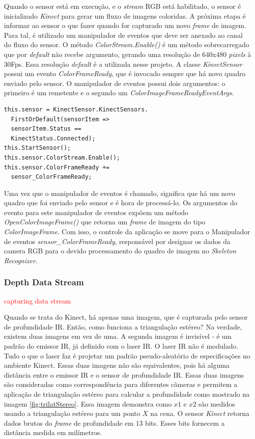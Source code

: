 Quando o sensor está em execução, e o \textit{stream} RGB está habilitado, o sensor é inicializado  \textit{Kinect} para gerar um fluxo de imagens coloridas. A próxima etapa é informar ao sensor o que fazer quando for capturado um novo \textit{frame} de imagem. Para tal, é utilizado um manipulador de eventos que deve ser anexado ao canal do fluxo do sensor. O método \textit{ColorStream.Enable()} é um método sobrecarregado que por \textit{default} não recebe argumento, gerando uma resolução de  640x480 \textit{pixels} à 30Fps. Essa resolução \textit{default} é a utilizada nesse projeto. A classe \textit{KinectSensor} possui um evento \textit{ColorFrameReady}, que é invocado sempre que há novo quadro enviado pelo sensor. O manipulador de eventos possui dois argumentos: o primeiro é um remetente e o segundo um \textit{ColorImageFrameReadyEventArgs}.

\begin{verbatim}
this.sensor = KinectSensor.KinectSensors.
  FirstOrDefault(sensorItem => 
  sensorItem.Status == 
  KinectStatus.Connected);
this.StartSensor();
this.sensor.ColorStream.Enable();
this.sensor.ColorFrameReady += 
  sensor_ColorFrameReady;
\end{verbatim}


Uma vez que o manipulador de eventos é chamado, significa que há um novo quadro que foi enviado pelo sensor e é hora de processá-lo. Os argumentos do evento para este manipulador de eventos expõem um método \textit{OpenColorImageFrame()} que retorna um \textit{frame} de imagem do tipo \textit{ColorImageFrame}. Com isso, o controle da aplicação se move para o Manipulador de eventos \textit{sensor\_ColorFrameReady}, responsável por designar os dados da camera RGB para o devido  processamento do quadro de imagem no \textit{Skeleton Recognizer}. 

\subsubsection{Depth Data Stream}\label{sec:depthDataStream}
\textcolor{red}{capturing data stream}

Quando se trata do Kinect, há apenas uma imagem, que é capturada pelo sensor de profundidade IR. Então, como funciona a triangulação estéreo? Na verdade, existem duas imagens em vez de uma. A segunda imagem é invisível - é um padrão do emissor IR, já definido com o laser IR. O laser IR não é modulado. Tudo o que o laser faz é projetar um padrão pseudo-aleatório de especificações no ambiente Kinect. Essas duas imagens não são equivalentes, pois há alguma distância entre o emissor IR e o sensor de profundidade IR. Essas duas imagens são consideradas como correspondência para diferentes câmeras e permitem a aplicação de triangulação estéreo para calcular a profundidade como mostrado na imagem \ref{fig:trilatStereo}. Essa imagem demonstra como $x1$ e $x2$ são medidos usando a triangulação estéreo para um ponto $X$ na cena. O sensor \textit{Kinect} retorna dados brutos do \textit{frame} de profundidade em 13 bits. Esses bits fornecem a distância medida em milímetros.

